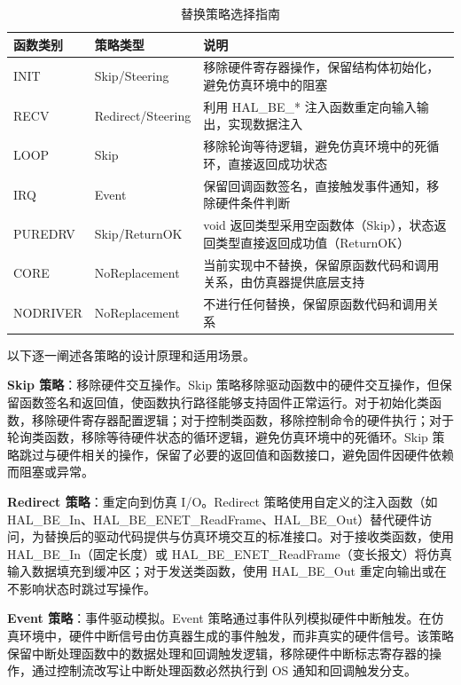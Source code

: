 \begin{table}[htbp]
\centering
\caption{替换策略选择指南}
\label{tab:replace-strategies}
\footnotesize
\setlength{\tabcolsep}{4pt}
\begin{tabular}{@{}llp{5.9cm}@{}}
\toprule
\textbf{函数类别} & \textbf{策略类型} & \textbf{说明} \\
\midrule
INIT & Skip/Steering & 移除硬件寄存器操作，保留结构体初始化，避免仿真环境中的阻塞 \\
RECV & Redirect/Steering & 利用 HAL\_BE\_* 注入函数重定向输入输出，实现数据注入 \\
LOOP & Skip & 移除轮询等待逻辑，避免仿真环境中的死循环，直接返回成功状态 \\
IRQ & Event & 保留回调函数签名，直接触发事件通知，移除硬件条件判断 \\
PUREDRV & Skip/ReturnOK & void 返回类型采用空函数体（Skip），状态返回类型直接返回成功值（ReturnOK） \\
\midrule
CORE & NoReplacement & 当前实现中不替换，保留原函数代码和调用关系，由仿真器提供底层支持 \\
NODRIVER & NoReplacement & 不进行任何替换，保留原函数代码和调用关系 \\
\bottomrule
\end{tabular}
\end{table}

以下逐一阐述各策略的设计原理和适用场景。

\textbf{Skip 策略}：移除硬件交互操作。Skip 策略移除驱动函数中的硬件交互操作，但保留函数签名和返回值，使函数执行路径能够支持固件正常运行。对于初始化类函数，移除硬件寄存器配置逻辑；对于控制类函数，移除控制命令的硬件执行；对于轮询类函数，移除等待硬件状态的循环逻辑，避免仿真环境中的死循环。Skip 策略跳过与硬件相关的操作，保留了必要的返回值和函数接口，避免固件因硬件依赖而阻塞或异常。

\textbf{Redirect 策略}：重定向到仿真 I/O。Redirect 策略使用自定义的注入函数（如 HAL\_BE\_In、HAL\_BE\_ENET\_ReadFrame、HAL\_BE\_Out）替代硬件访问，为替换后的驱动代码提供与仿真环境交互的标准接口。对于接收类函数，使用 HAL\_BE\_In（固定长度）或 HAL\_BE\_ENET\_ReadFrame（变长报文）将仿真输入数据填充到缓冲区；对于发送类函数，使用 HAL\_BE\_Out 重定向输出或在不影响状态时跳过写操作。

\textbf{Event 策略}：事件驱动模拟。Event 策略通过事件队列模拟硬件中断触发。在仿真环境中，硬件中断信号由仿真器生成的事件触发，而非真实的硬件信号。该策略保留中断处理函数中的数据处理和回调触发逻辑，移除硬件中断标志寄存器的操作，通过控制流改写让中断处理函数必然执行到 OS 通知和回调触发分支。

